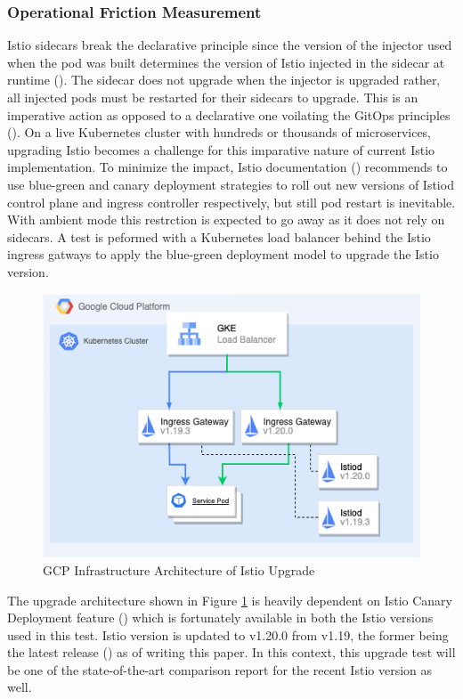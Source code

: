 \subsubsection{Operational Friction Measurement}
Istio sidecars break the declarative principle since the version of the injector used when the pod was built determines the version of Istio injected in the sidecar at runtime (\cite{gitMitch2023}). The sidecar does not upgrade when the injector is upgraded rather, all injected pods must be restarted for their sidecars to upgrade. This is an imperative action as opposed to a declarative one voilating the GitOps principles (\cite{gitopsBook}). On a live Kubernetes cluster with hundreds or thousands of microservices, upgrading Istio becomes a challenge for this imparative nature of current Istio implementation. To minimize the impact, Istio documentation (\cite{istioDocCanaryUpgrade}) recommends to use blue-green and canary deployment strategies to roll out new versions of Istiod control plane and ingress controller respectively, but still pod restart is inevitable. With ambient mode this restrction is expected to go away as it does not rely on sidecars. A test is peformed with a Kubernetes load balancer behind the Istio ingress gatways to apply the blue-green deployment model to upgrade the Istio version.

\begin{figure}[ht!]
  \centering
  \includegraphics[width=0.9\linewidth]{resources/istio-upgrade-strategy.drawio.png}
  \caption{GCP Infrastructure Architecture of Istio Upgrade}
  \label{method:istioUpgradeArch}
\end{figure}

The upgrade architecture shown in Figure \ref{method:istioUpgradeArch} is heavily dependent on Istio Canary Deployment feature (\cite{istioDocHelm}) which is fortunately available in both the Istio versions used in this test. Istio version is updated to v1.20.0 from v1.19, the former being the latest release (\cite{istioNewsVersion}) as of writing this paper. In this context, this upgrade test will be one of the state-of-the-art comparison report for the recent Istio version as well.

